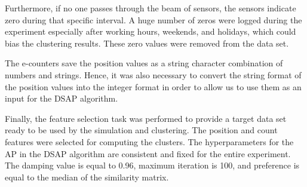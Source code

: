 Furthermore, if no one passes through the beam of sensors, the sensors indicate zero during that specific interval. A huge number of zeros were logged during the experiment especially after working hours, weekends, and holidays, which could bias the clustering results. These zero values were removed from the data set. 

The e-counters save the position values as a string character combination of numbers and strings. Hence, it was also necessary to convert the string format of the position values into the integer format in order to allow us to use them as an input for the DSAP algorithm. 

Finally, the feature selection task was performed to provide a target data set ready to be used by the simulation and clustering. The position and count features were selected for computing the clusters. The hyperparameters for the AP in the DSAP algorithm are consistent and fixed for the entire experiment. The damping value is equal to 0.96, maximum iteration is 100, and preference is equal to the median of the similarity matrix.








